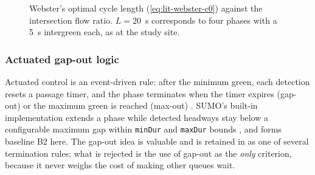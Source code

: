 \begin{figure}[htbp]
  \centering
  \caption{Webster's optimal cycle length (\cref{eq:lit-webster-c0}) against the intersection flow ratio.
  $L=20$~s corresponds to four phases with a 5~s intergreen each, as at the study site.}
  \label{fig:lit-webster}
\end{figure}

\subsubsection{Actuated gap-out logic}
Actuated control is an event-driven rule: after the minimum green, each detection resets a passage timer, and
the phase terminates when the timer expires (gap-out) or the maximum green is reached (max-out)
\cite{koonce2008timing}. SUMO's built-in implementation extends a phase while detected headways stay below a
configurable maximum gap within \texttt{minDur} and \texttt{maxDur} bounds \cite{sumo_actuated}, and forms
baseline B2 here. The gap-out idea is valuable and is retained in \prism{} as one of several termination rules;
what is rejected is the use of gap-out as the \emph{only} criterion, because it never weighs the cost of making
other queues wait.

